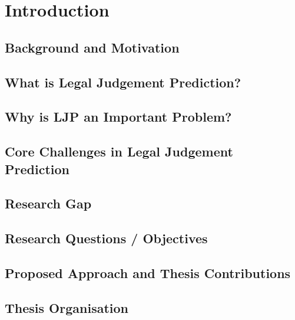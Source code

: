 \chapter{Introduction}

\section{Background and Motivation}
\section{What is Legal Judgement Prediction?}
\section{Why is LJP an Important Problem?}
\section{Core Challenges in Legal Judgement Prediction}
\section{Research Gap}
\section{Research Questions / Objectives}
\section{Proposed Approach and Thesis Contributions}
\section{Thesis Organisation}
